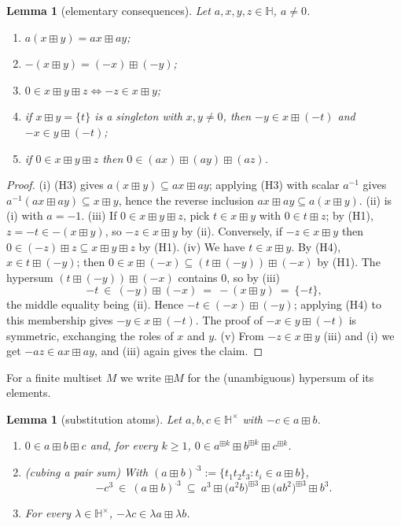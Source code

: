 \documentclass[11pt]{article}
\newtheorem{lemma}[theorem]{Lemma}
\theoremstyle{definition}
\theoremstyle{remark}
\newcommand{\Hb}{\mathbb{H}}
\newcommand{\bp}{\boxplus}
\begin{document}
\begin{lemma}[elementary consequences]\label{lem:basic}
Let $a,x,y,z\in\Hb$, $a\neq0$.
\begin{enumerate}[label=\textup{(\roman*)}]
\item $a(x\bp y)=ax\bp ay$;
\item $-(x\bp y)=(-x)\bp(-y)$;
\item $0\in x\bp y\bp z\iff -z\in x\bp y$;
\item if $x\bp y=\{t\}$ is a singleton with $x,y\neq0$, then
$-y\in x\bp(-t)$ and $-x\in y\bp(-t)$;
\item if $0\in x\bp y\bp z$ then $0\in(ax)\bp(ay)\bp(az)$.
\end{enumerate}
\end{lemma}

\begin{proof}
(i) (H3) gives $a(x\bp y)\subseteq ax\bp ay$; applying (H3) with scalar
$a^{-1}$ gives $a^{-1}(ax\bp ay)\subseteq x\bp y$, hence the reverse
inclusion $ax\bp ay\subseteq a(x\bp y)$.
(ii) is (i) with $a=-1$.
(iii) If $0\in x\bp y\bp z$, pick $t\in x\bp y$ with $0\in t\bp z$; by
(H1), $z=-t\in-(x\bp y)$, so $-z\in x\bp y$ by (ii). Conversely, if
$-z\in x\bp y$ then $0\in(-z)\bp z\subseteq x\bp y\bp z$ by (H1).
(iv) We have $t\in x\bp y$. By (H4), $x\in t\bp(-y)$; then
$0\in x\bp(-x)\subseteq(t\bp(-y))\bp(-x)$ by (H1). The hypersum
$(t\bp(-y))\bp(-x)$ contains $0$, so by (iii)
\[
  -t\ \in\ (-y)\bp(-x)\ =\ -(x\bp y)\ =\ \{-t\},
\]
the middle equality being (ii). Hence $-t\in(-x)\bp(-y)$; applying (H4)
to this membership gives $-y\in x\bp(-t)$. The proof of
$-x\in y\bp(-t)$ is symmetric, exchanging the roles of $x$ and $y$.
(v) From $-z\in x\bp y$ (iii) and (i) we get $-az\in ax\bp ay$, and
(iii) again gives the claim.
\end{proof}

For a finite multiset $M$ we write $\boxplus M$ for the (unambiguous)
hypersum of its elements.

\begin{lemma}[substitution atoms]\label{lem:atoms}
Let $a,b,c\in\Hb^{\times}$ with $-c\in a\bp b$.
\begin{enumerate}[label=\textup{(A\arabic*)}]
\item $0\in a\bp b\bp c$ and, for every $k\ge1$,
$0\in a^{\bp k}\bp b^{\bp k}\bp c^{\bp k}$.
\item \textup{(cubing a pair sum)} With
$(a\bp b)^{\cdot3}:=\{t_1t_2t_3:t_i\in a\bp b\}$,
\[
  -c^{3}\ \in\ (a\bp b)^{\cdot3}\ \subseteq\
   a^{3}\bp\bigl(a^{2}b\bigr)^{\bp3}\bp\bigl(ab^{2}\bigr)^{\bp3}\bp b^{3}.
\]
\item For every $\lambda\in\Hb^\times$, $-\lambda c\in\lambda a\bp\lambda b$.
\end{enumerate}
\end{lemma}
\end{document}
